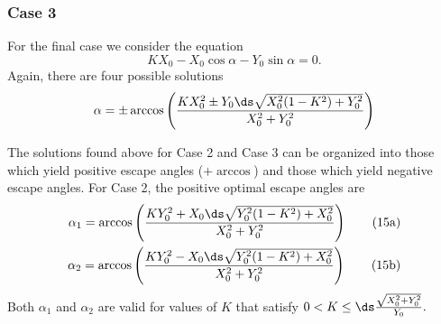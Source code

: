 \subsubsection{Case 3}
For the final case we consider the equation 
%
\begin{equation}
K X_0 - X_0 \cos \alpha - Y_0 \sin\alpha = 0.
\end{equation}
%
Again, there are four possible solutions
%
\begin{equation}
\alpha = \pm \arccos \left( \frac{K X_0^2 \pm Y_0 
\ds \sqrt{X_0^2(1-K^2) +Y_0^2}}{X_0^2+Y_0^2} \right )
\end{equation}
%

The solutions found above for Case 2 and Case 3 can be organized into those which yield positive escape angles ($+ \arccos$) and those which yield negative escape angles. For Case 2, the positive optimal escape angles are 
%
\begin{align}
\alpha_{1} =  \arccos \left( \frac{K Y_0^2 +X_0 
\ds\sqrt{Y_0^2(1- K^2) + X_0^2 }}{X_0^2+Y_0^2} \right )
\tag{15a} \label{root_a} \\
\alpha_{2} = \arccos \left(\frac{K Y_0^2 - X_0 
\ds\sqrt{Y_0^2(1- K^2) + X_0^2 }}{X_0^2+Y_0^2} \right )
\tag{15b} \label{root_b}
\end{align}
%
Both $\alpha_1$ and $\alpha_2$ are valid for values of $K$ that satisfy 
$0< K \leq \ds \frac{\sqrt{X_0^2 + Y_0^2}}{Y_0}.$




